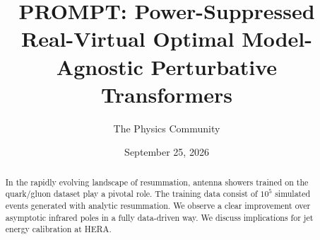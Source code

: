 \documentclass[11pt]{article}
\title{PROMPT: Power-Suppressed Real-Virtual Optimal Model-Agnostic Perturbative Transformers}
\author{The Physics Community}
\date{September 25, 2026}
\begin{document}
\maketitle
\begin{abstract}
In the rapidly evolving landscape of resummation, antenna showers
trained on the quark/gluon dataset play a pivotal role. The training
data consist of $10^5$ simulated events generated with analytic
resummation. We observe a clear improvement over asymptotic infrared
poles in a fully data-driven way. We discuss implications for jet energy
calibration at HERA.
\end{abstract}
\tableofcontents




\nocite{*}


\end{document}
